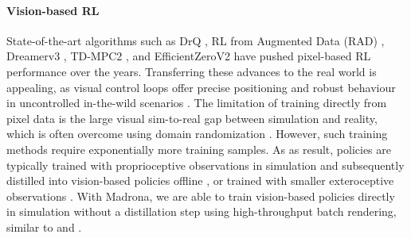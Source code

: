 \paragraph{Vision-based RL} State-of-the-art algorithms such as DrQ \cite{yarats2021drqv2}, RL from Augmented Data (RAD) \cite{laskin_lee2020rad}, Dreamerv3 \cite{hafner2023dreamerv3}, TD-MPC2 \cite{hansen2024tdmpc2}, and EfficientZeroV2 \cite{wang2024efficientzero} have pushed pixel-based RL performance over the years. Transferring these advances to the real world is appealing, as visual control loops offer precise positioning and robust behaviour in uncontrolled in-the-wild scenarios \cite{haiderbhai2024cutrope}. The limitation of training directly from pixel data is the large visual sim-to-real gap between simulation and reality, which is often overcome using domain randomization \cite{domainrand2017}. However, such training methods require exponentially more training samples. As as result, policies are typically trained with proprioceptive observations in simulation and subsequently distilled into vision-based policies offline \cite{chen2022system, haarnoja2024learning, cheng2024extreme}, or trained with smaller exteroceptive observations \cite{miki2022learning, agarwal2023legged}. With Madrona, we are able to train vision-based policies directly in simulation without a distillation step using high-throughput batch rendering, similar to \cite{mittal2023orbit} and \cite{tao2024maniskill3}.
